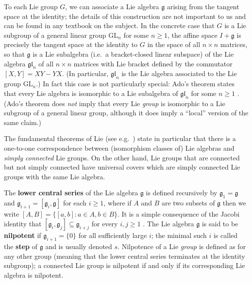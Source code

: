 To each Lie group $G$, we can associate a Lie algebra $\mathfrak{g}$ arising from the tangent space at the identity; the details of this construction are not important to us and can be found in any textbook on the subject. In the concrete case that $G$ is a Lie subgroup of a general linear group $\mathrm{GL}_n$ for some $n\geq 1$, the affine space
%
  $I+\mathfrak{g}$ is precisely the tangent space at the identity to $G$ in the space of all $n\times n$ matrices, so that $\mathfrak{g}$ is a Lie subalgebra (i.e.\ a bracket-closed linear subspace) of the Lie algebra $\mathfrak{gl}_n$ of all $n\times n$ matrices with Lie bracket defined by the commutator $[X,Y]=XY-YX$. (In particular, $\mathfrak{gl}_n$ is the Lie algebra associated to the Lie group $\mathrm{GL}_n$.)
%
%
%
%
In fact this case is not particularly special:
Ado's theorem states that every Lie algebra is isomorphic to a Lie subalgebra  of $\mathfrak{gl}_n$ for some $n\geq 1$ \cite[Chapter 2.3]{MR3237440}. (Ado's theorem does \emph{not} imply that every Lie \emph{group} is isomorphic to a Lie subgroup of a general linear group, although it does imply a ``local'' version of the same claim.)

\medskip

The fundamental theorems of Lie (see e.g.\ \cite[Chapter 2.5.1]{MR3237440}) state in particular that there is a one-to-one correspondence between (isomorphism classes of) Lie algebras and \emph{simply connected} Lie groups. On the other hand, Lie groups that are connected but not simply connected have universal covers which are simply connected Lie groups with the same Lie algebra. 

\medskip


The \textbf{lower central series} of the Lie algebra $\mathfrak{g}$ is defined recursively by $\mathfrak{g}_1=\mathfrak{g}$ and $\mathfrak{g}_{i+1}=[\mathfrak{g}_i,\mathfrak{g}]$ for each $i\geq 1$, where if $A$ and $B$ are two subsets of $\mathfrak{g}$ then we write $[A,B]=\{[a,b]:a\in A,b\in B\}$. It is a simple consequence of the Jacobi identity that $[\mathfrak{g}_i,\mathfrak{g}_j] \subseteq \mathfrak{g}_{i+j}$ for every $i,j \geq 1$ \cite[Lemma 1.4.3]{Wang2023}. The Lie algebra $\mathfrak{g}$ is said to be \textbf{nilpotent} if $\mathfrak{g}_{i+1}=\{0\}$ for all sufficiently large $i$; the minimal such $i$ is called the \textbf{step} of $\mathfrak{g}$ and is usually denoted $s$. Nilpotence of a Lie \emph{group} is defined as for any other group (meaning that the lower central series terminates at the identity subgroup); a connected Lie group is nilpotent if and only if its corresponding Lie algebra is nilpotent.


